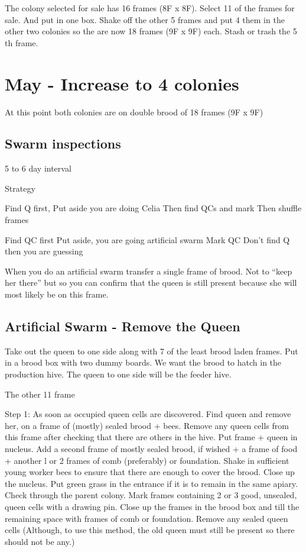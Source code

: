 \documentclass{./BeekeepingBook}
\begin{document}
The colony selected for sale has 16 frames (8F x 8F).
Select 11 of the frames for sale.
And put in one box.
Shake off the other 5 frames and put 4 them in the other two colonies so the are now 18 frames (9F x 9F) each.
Stash or trash the 5 th frame.

\section{May - Increase to 4 colonies}

At this point both colonies are on double brood of 18 frames (9F x 9F)

\subsection{Swarm inspections}

5 to 6 day interval

Strategy

Find Q first,
Put aside you are doing Celia
Then find QCs and mark
Then shuffle frames

Find QC first
Put aside, you are going artificial swarm
Mark QC
Don’t find Q then you are guessing
 
When you do an artificial swarm transfer a single frame of brood.  
Not to “keep her there” but so you can confirm that the queen is still present because she will most likely be on this frame.


\subsection{Artificial Swarm - Remove the Queen}

Take out the queen to one side along with 7 of the least brood laden frames.  
Put in a brood box with two dummy boards.
We want the brood to hatch in the production hive.
The queen to one side will be the feeder hive.

The other 11 frame





Step 1: As soon as occupied queen cells are discovered.
Find queen and remove her, on a frame of (mostly) sealed brood + bees. Remove any queen cells from this frame after checking that there are others in the hive.
Put frame + queen in nucleus.
Add a second frame of mostly sealed brood, if wished + a frame of food + another l or 2
frames of comb (preferably) or foundation.
Shake in sufficient young worker bees to ensure that there are enough to cover the brood.
Close up the nucleus. Put green grass in the entrance if it is to remain in the same apiary.
Check through the parent colony.  Mark frames containing 2 or 3 good, unsealed, queen cells with a drawing pin.
Close up the frames in the brood box and till the remaining space with frames of comb or foundation.
Remove any sealed queen cells (Although, to use this method, the old queen must still be present so there should not be any.)
 
\end{document}
